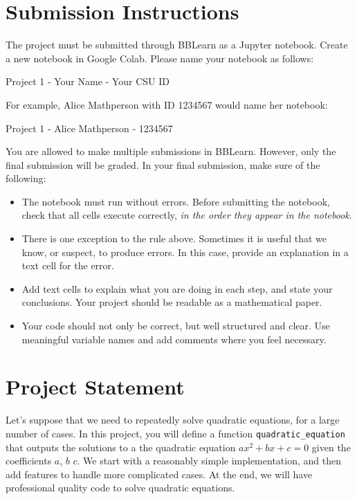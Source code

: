 \documentclass[12pt]{article}
\begin{document}
\sffamily

\section{Submission Instructions}
The project must be submitted through BBLearn as a Jupyter notebook. Create a new notebook in Google Colab. Please name your notebook as follows:

\begin{center}
Project 1 - Your Name - Your CSU ID
\end{center}

For example, Alice Mathperson with ID 1234567 would name her notebook:

\begin{center}
Project 1 - Alice Mathperson - 1234567
\end{center}

You are allowed to make multiple submissions in BBLearn. However, only the final submission will be graded. In your final submission, make sure of the following:

\begin{itemize}
\item The notebook must run without errors. Before submitting the notebook, check that all cells execute correctly, \emph{in the order they appear in the notebook}.
\item There is one exception to the rule above. Sometimes it is useful that we know, or suspect, to produce errors. In this case, provide an explanation in a text cell for the error.
\item Add text cells to explain what you are doing in each step, and state your conclusions. Your project should be readable as a mathematical paper.
\item Your code should not only be correct, but well structured and clear. Use meaningful variable names and add comments where you feel necessary.
\end{itemize}

\section{Project Statement}
Let's suppose that we need to repeatedly solve quadratic equations, for a large number of cases. In this project, you will define a function \texttt{quadratic\_equation} that outputs the solutions to a the quadratic equation $ax^2+bx+c=0$ given the coefficients $a$, $b$ $c$. We start with a reasonably simple implementation, and then add features to handle more complicated cases. At the end, we will have professional quality code to solve quadratic equations.
\end{document}
